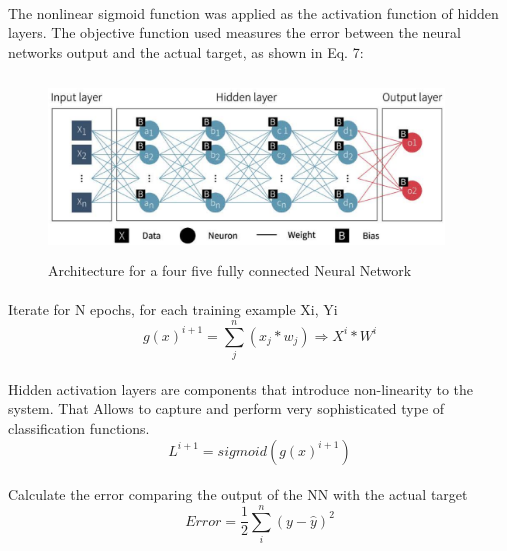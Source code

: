 \documentclass{llncs}       %
\begin{document}
\paragraph{}
The nonlinear sigmoid function was applied as the activation function of hidden layers. The objective function used measures the error between the neural networks output and the actual target, as shown in Eq. 7: 

\begin{figure}[h]
\centering
\includegraphics[width=10.51cm,height=4.77cm]{media/deep-nn1.eps}
\caption{Architecture for a four five fully connected 
Neural Network}
\end{figure}


\paragraph{}Iterate for N epochs,  for each training example Xi, Yi 
\begin{equation} 
g(x)^{i+1}=\sum_j^n(x_{j}*w_{j})\Rightarrow X^{i}*W^{i}
\end{equation}

\paragraph{}
Hidden activation layers are components that introduce non-linearity to 
the system. That Allows to capture and perform very sophisticated type 
of classification functions.
\begin{equation} 
L^{i+1}=sigmoid(g(x)^{i+1})
\end{equation}

\paragraph{}
\paragraph{}Calculate the error comparing the output of the NN with the actual target 
\begin{equation} 
Error = \frac{1}{2}\sum_i^n( y -\widehat{y})^2
\end{equation}
\end{document}
